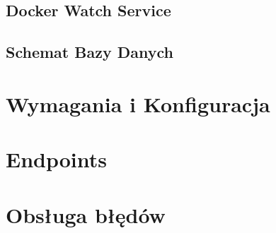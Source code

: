 \subsection{Docker Watch Service}
\label{sec:dockerWatchService}

\subsection{Schemat Bazy Danych}

\section{Wymagania i Konfiguracja}
\label{sec:wymaganiaIKonfiguracja}

\section{Endpoints}

\section{Obsługa błędów}

